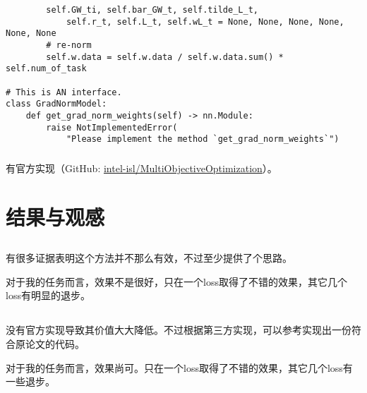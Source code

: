 \documentclass{ctexart}
\begin{document}
\begin{verbatim}
        self.GW_ti, self.bar_GW_t, self.tilde_L_t, 
            self.r_t, self.L_t, self.wL_t = None, None, None, None, None, None
        # re-norm
        self.w.data = self.w.data / self.w.data.sum() * self.num_of_task

# This is AN interface.
class GradNormModel:
    def get_grad_norm_weights(self) -> nn.Module:
        raise NotImplementedError(
            "Please implement the method `get_grad_norm_weights`")
\end{verbatim}

\subsubsection{}

有官方实现（GitHub: \href{https://github.com/intel-isl/MultiObjectiveOptimization}{intel-isl/MultiObjectiveOptimization}）。

\section{结果与观感}

\subsection{}

有很多证据表明这个方法并不那么有效，不过至少提供了个思路。

对于我的任务而言，效果不是很好，只在一个loss取得了不错的效果，其它几个loss有明显的退步。

\subsection{}

没有官方实现导致其价值大大降低。不过根据第三方实现，可以参考实现出一份符合原论文的代码。

对于我的任务而言，效果尚可。只在一个loss取得了不错的效果，其它几个loss有一些退步。

\subsection{}


\end{document}
